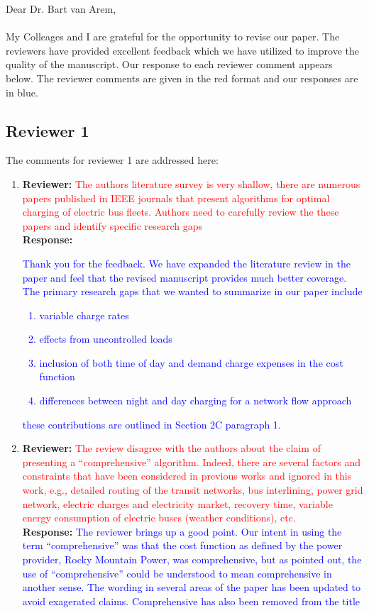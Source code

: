 \documentclass{article}
\newcommand\formatfeedback[2]
{%
	\textbf{Reviewer:} \textcolor{red}{#1} 
	\\[0.1in] \textbf{Response:} \textcolor{blue}{#2}
}
\begin{document}
\noindent Dear Dr. Bart van Arem, \\ \\
My Colleages and I are grateful for the opportunity to revise our paper. The reviewers have provided excellent feedback which we have utilized to improve the quality of the manuscript. Our response to each reviewer comment appears below. The reviewer comments are given in the red format and our responses are in blue.

\subsection*{Reviewer 1}
The comments for reviewer 1 are addressed here:
\begin{enumerate}
	\item \formatfeedback{The authors literature survey is very shallow, there are numerous papers published in IEEE journals that present algorithms for optimal charging of electric bus fleets. Authors need to carefully review the these papers and identify specific research gaps}%
			     {Thank you for the feedback. We have expanded the literature review in the paper and feel that the revised manuscript provides much better coverage. The primary research gaps that we wanted to summarize in our paper include
				\begin{enumerate}
					\item variable charge rates
					\item effects from uncontrolled loads
					\item inclusion of both time of day and demand charge expenses in the cost function
					\item differences between night and day charging for a network flow approach 
				\end{enumerate} 
			      these contributions are outlined in Section 2C paragraph 1.}
	\item \formatfeedback{The review disagree with the authors about the claim of presenting a ``comprehensive'' algorithm. Indeed, there are several factors and constraints that have been considered in previous works and ignored in this work, e.g., detailed routing of the transit networks, bus interlining, power grid network, electric charges and electricity market, recovery time, variable energy consumption of electric buses (weather conditions), etc.}%
		             {The reviewer brings up a good point. Our intent in using the term ``comprehensive'' was that the cost function as defined by the power provider, Rocky Mountain Power, was comprehensive, but as pointed out, the use of ``comprehensive'' could be understood to mean comprehensive in another sense. The wording in several areas of the paper has been updated to avoid exagerated claims. Comprehensive has also been removed from the title}

\end{enumerate}
\end{document}
